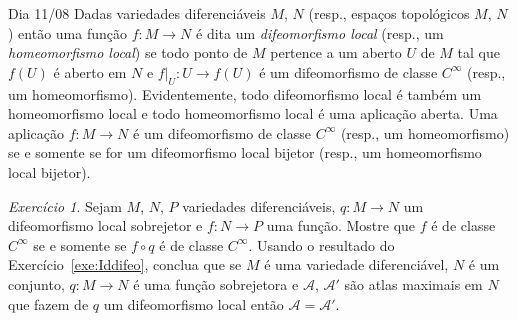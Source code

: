 \documentclass[oneside,11pt]{amsart}
\theoremstyle{remark}\newtheorem{exercise}{Exercício}[section]
\theoremstyle{plain}\newtheorem{teo}{Teorema}[section]
\theoremstyle{plain}\newtheorem{lem}[teo]{Lema}
\theoremstyle{plain}\newtheorem{prop}[teo]{Proposição}
\theoremstyle{definition}\newtheorem{defin}[teo]{Definição}
\theoremstyle{remark}\newtheorem{rem}[teo]{Observação}
\theoremstyle{definition}\newtheorem{example}[teo]{Exemplo}
\numberwithin{equation}{section}
\begin{document}
\begin{section}{Dia 11/08}
Dadas variedades diferenciáveis $M$, $N$ (resp., espaços topológicos $M$, $N$) então uma função $f:M\to N$ é dita um {\em difeomorfismo local\/}
(resp., um {\em homeomorfismo local}) se todo ponto de $M$ pertence a um aberto $U$ de $M$ tal que $f(U)$ é aberto em $N$ e
$f\vert_U:U\to f(U)$ é um difeomorfismo de classe $C^\infty$ (resp., um homeomorfismo). Evidentemente, todo difeomorfismo local é também um homeomorfismo local e todo
homeomorfismo local é uma aplicação aberta. Uma aplicação $f:M\to N$ é um difeomorfismo de classe $C^\infty$ (resp., um homeomorfismo) se e somente se
for um difeomorfismo local bijetor (resp., um homeomorfismo local bijetor).
\begin{exercise}\label{exe:quocdiflocal}
Sejam $M$, $N$, $P$ variedades diferenciáveis, $q:M\to N$ um difeomorfismo local sobrejetor e $f:N\to P$ uma função. Mostre que $f$ é de classe $C^\infty$
se e somente se $f\circ q$ é de classe $C^\infty$. Usando o resultado do Exercício~\ref{exe:Iddifeo}, conclua que se $M$ é uma variedade diferenciável, $N$ é um conjunto,
$q:M\to N$ é uma função sobrejetora e $\mathcal A$, $\mathcal A'$ são atlas maximais em $N$ que fazem de $q$ um difeomorfismo local então $\mathcal A=\mathcal A'$.
\end{exercise}


\end{section}
\end{document}
